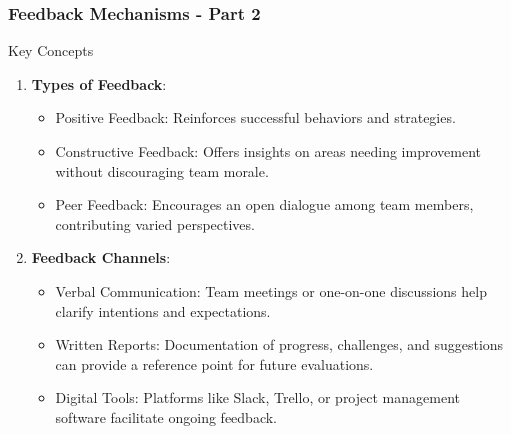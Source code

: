 \documentclass[aspectratio=169]{beamer}
\begin{document}
\begin{frame}[fragile]
    \frametitle{Feedback Mechanisms - Part 2}
    \begin{block}{Key Concepts}
        \begin{enumerate}
            \item \textbf{Types of Feedback}:
            \begin{itemize}
                \item Positive Feedback: Reinforces successful behaviors and strategies.
                \item Constructive Feedback: Offers insights on areas needing improvement without discouraging team morale.
                \item Peer Feedback: Encourages an open dialogue among team members, contributing varied perspectives.
            \end{itemize}
            \item \textbf{Feedback Channels}:
            \begin{itemize}
                \item Verbal Communication: Team meetings or one-on-one discussions help clarify intentions and expectations.
                \item Written Reports: Documentation of progress, challenges, and suggestions can provide a reference point for future evaluations.
                \item Digital Tools: Platforms like Slack, Trello, or project management software facilitate ongoing feedback.
            \end{itemize}
        \end{enumerate}
    \end{block}
\end{frame}
\end{document}
